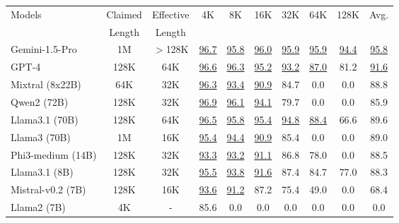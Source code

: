 \begin{tabular}{l|cc|cccccc|c}
\toprule[1.1pt]
Models & Claimed & Effective & 4K & 8K & 16K & 32K & 64K & 128K & Avg. \\
 & Length & Length & & & & & & & \\
\midrule[1.1pt]
Gemini-1.5-Pro & 1M & $>$128K & \underline{96.7} & \underline{95.8} & \underline{96.0} & \underline{95.9} & \underline{95.9} & \underline{94.4} & \underline{95.8} \\
GPT-4 & 128K & 64K & \underline{96.6} & \underline{96.3} & \underline{95.2} & \underline{93.2} & \underline{87.0} & 81.2 & \underline{91.6} \\
Mixtral (8x22B) & 64K & 32K & \underline{96.3} & \underline{93.4} & \underline{90.9} & 84.7 & 0.0 & 0.0 & 88.8 \\
Qwen2 (72B) & 128K & 32K & \underline{96.9} & \underline{96.1} & \underline{94.1} & 79.7 & 0.0 & 0.0 & 85.9 \\
Llama3.1 (70B) & 128K & 64K & \underline{96.5} & \underline{95.8} & \underline{95.4} & \underline{94.8} & \underline{88.4} & 66.6 & 89.6 \\
Llama3 (70B) & 1M & 16K & \underline{95.4} & \underline{94.4} & \underline{90.9} & 85.4 & 0.0 & 0.0 & 89.0 \\
Phi3-medium (14B) & 128K & 32K & \underline{93.3} & \underline{93.2} & \underline{91.1} & 86.8 & 78.0 & 0.0 & 88.5 \\
Llama3.1 (8B) & 128K & 32K & \underline{95.5} & \underline{93.8} & \underline{91.6} & 87.4 & 84.7 & 77.0 & 88.3 \\
Mistral-v0.2 (7B) & 128K & 16K & \underline{93.6} & \underline{91.2} & 87.2 & 75.4 & 49.0 & 0.0 & 68.4 \\
Llama2 (7B) & 4K & - & 85.6 & 0.0 & 0.0 & 0.0 & 0.0 & 0.0 & 0.0 \\
\bottomrule[1.1pt]
\end{tabular} 